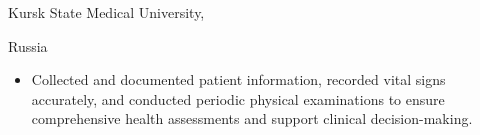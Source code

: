 \documentclass[10pt,a4paper]{article}
\newcommand{\mregular}{\fontseries{m}\selectfont}
\begin{document}
{\begin{minipage}[t]{280pt}
{{\mregular
Kursk State Medical University,\par
Russia\par
}
}

\vspace{4pt}

{\fontsize{11}{15}\selectfont\mregular\justifying
{}

\begin{itemize}[
  leftmargin=17pt,
  labelsep=8pt,
  itemsep=1.5pt,
  topsep=0pt,
  parsep=0pt,
  partopsep=0pt
]
  \item Collected and documented patient information, recorded vital signs accurately, and conducted periodic physical examinations to ensure comprehensive health assessments and support clinical decision-making.
\end{itemize}
}

\end{minipage}%
}
\end{document}
